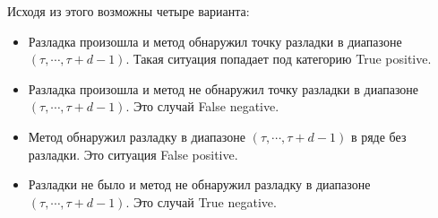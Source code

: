 \documentclass[%
12pt,
master,  %
natbib,      %
subf,        %
substylefile = spbu.rtx,
href,        %
colorlinks,  %
]{disser}
\begin{document}
Исходя из этого возможны четыре варианта:



\begin{itemize}
	\item Разладка произошла и метод обнаружил точку разладки в диапазоне $(\tau, \cdots, \tau+d-1)$. Такая ситуация попадает под категорию True positive.
	\item Разладка произошла и метод не обнаружил точку разладки в диапазоне $(\tau, \cdots, \tau+d-1)$. Это случай False negative.
	\item Метод обнаружил разладку в диапазоне $(\tau, \cdots, \tau+d-1)$ в ряде без разладки. Это ситуация False positive.
	\item Разладки не было и метод не обнаружил разладку в диапазоне $(\tau, \cdots, \tau+d-1)$. Это случай True negative.
\end{itemize}
\end{document}
